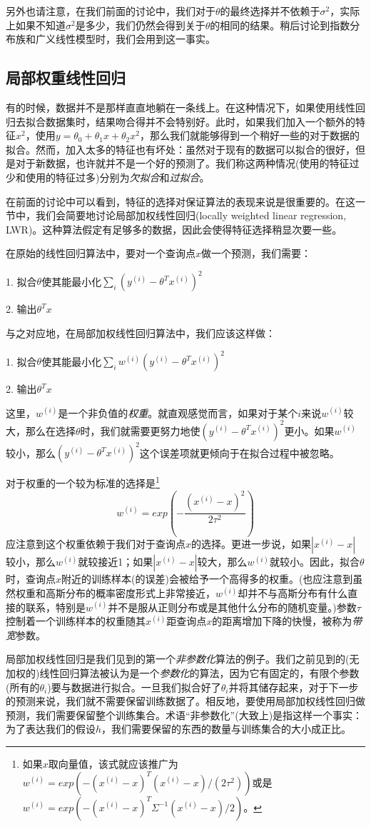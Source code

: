 另外也请注意，在我们前面的讨论中，我们对于$\theta$的最终选择并不依赖于$\sigma^2$，实际上如果不知道$\sigma^2$是多少，我们仍然会得到关于$\theta$的相同的结果。稍后讨论到指数分布族和广义线性模型时，我们会用到这一事实。

\subsection{局部权重线性回归}
有的时候，数据并不是那样直直地躺在一条线上。在这种情况下，如果使用线性回归去拟合数据集时，结果吻合得并不会特别好。此时，如果我们加入一个额外的特征$x^2$，使用$y = \theta_0 + \theta_1x + \theta_2x^2$，那么我们就能够得到一个稍好一些的对于数据的拟合。然而，加入太多的特征也有坏处：虽然对于现有的数据可以拟合的很好，但是对于新数据，也许就并不是一个好的预测了。我们称这两种情况(使用的特征过少和使用的特征过多)分别为\emph{欠拟合}和\emph{过拟合}。

在前面的讨论中可以看到，特征的选择对保证算法的表现来说是很重要的。在这一节中，我们会简要地讨论局部加权线性回归(locally weighted linear regression, LWR)。这种算法假定有足够多的数据，因此会使得特征选择稍显次要一些。

在原始的线性回归算法中，要对一个查询点$x$做一个预测，我们需要：

1. 拟合$\theta$使其能最小化$\sum_i(y^{(i)} - \theta^Tx^{(i)})^2$

2. 输出$\theta^Tx$

与之对应地，在局部加权线性回归算法中，我们应该这样做：

1. 拟合$\theta$使其能最小化$\sum_iw^{(i)}(y^{(i)} - \theta^Tx^{(i)})^2$

2. 输出$\theta^Tx$

这里，$w^{(i)}$是一个非负值的\emph{权重}。就直观感觉而言，如果对于某个$i$来说$w^{(i)}$较大，那么在选择$\theta$时，我们就需要更努力地使$(y^{(i)} - \theta^Tx^{(i)})^2$更小。如果$w^{(i)}$较小，那么$(y^{(i)} - \theta^Tx^{(i)})^2$这个误差项就更倾向于在拟合过程中被忽略。

对于权重的一个较为标准的选择是\footnote{如果$x$取向量值，该式就应该推广为$w^{(i)} = exp(-(x^{(i)} - x)^T(x^{(i)} - x)/(2\tau^2))$或是$w^{(i)} = exp(-(x^{(i)} - x)^T\Sigma^{-1}(x^{(i)} - x)/2)$。}
\begin{equation}
w^{(i)} = exp\left(-\frac{(x^{(i)} - x)^2}{2\tau^2}\right)
\end{equation}
应注意到这个权重依赖于我们对于查询点$x$的选择。更进一步说，如果$|x^{(i)} - x|$较小，那么$w^{(i)}$就较接近1；如果$|x^{(i)} - x|$较大，那么$w^{(i)}$就较小。因此，拟合$\theta$时，查询点$x$附近的训练样本(的误差)会被给予一个高得多的权重。(也应注意到虽然权重和高斯分布的概率密度形式上非常接近，$w^{(i)}$却并不与高斯分布有什么直接的联系，特别是$w^{(i)}$并不是服从正则分布或是其他什么分布的随机变量。)参数$\tau$控制着一个训练样本的权重随其$x^{(i)}$距查询点$x$的距离增加下降的快慢，被称为\emph{带宽}参数。

局部加权线性回归是我们见到的第一个\emph{非参数化}算法的例子。我们之前见到的(无加权的)线性回归算法被认为是一个\emph{参数化}的算法，因为它有固定的，有限个参数(所有的$\theta_i$)要与数据进行拟合。一旦我们拟合好了$\theta_i$并将其储存起来，对于下一步的预测来说，我们就不需要保留训练数据了。相反地，要使用局部加权线性回归做预测，我们需要保留整个训练集合。术语“非参数化”(大致上)是指这样一个事实：为了表达我们的假设$h$，我们需要保留的东西的数量与训练集合的大小成正比。

